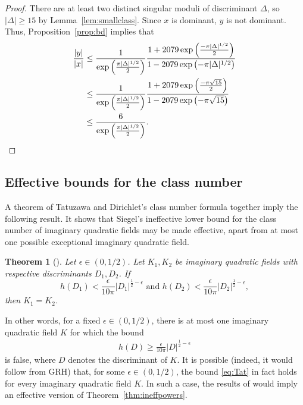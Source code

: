 \documentclass[11pt,a4paper, british]{amsart}
\newtheorem{thm}{Theorem}[section]
\theoremstyle{definition}
\theoremstyle{remark}
\numberwithin{equation}{section}
\begin{document}
\begin{proof}
	There are at least two distinct singular moduli of discriminant $\Delta$, so $\lvert \Delta \rvert \geq 15$ by Lemma~\ref{lem:smallclass}. Since $x$ is dominant, $y$ is not dominant.  Thus, Proposition~\ref{prop:bd} implies that
	\begin{align*}
		\frac{\lvert y \rvert}{\lvert x \rvert} &\leq  \frac{1}{\exp\left(\frac{\pi \lvert \Delta \rvert^{1/2}}{2}\right)} \frac{1 + 2079 \exp\left(\frac{-\pi \lvert \Delta \rvert^{1/2}}{2}\right)}{1 - 2079 \exp\left(- \pi \lvert \Delta \rvert^{1/2}\right)}\\ 
		&\leq \frac{1}{\exp\left(\frac{\pi \lvert \Delta \rvert^{1/2}}{2}\right)} \frac{1 + 2079 \exp\left(\frac{-\pi \sqrt{15}}{2}\right)}{1 - 2079 \exp\left(- \pi \sqrt{15}\right)}\\ 
		&\leq \frac{6}{\exp\left(\frac{\pi \lvert \Delta \rvert^{1/2}}{2}\right)}.\qedhere
		\end{align*}
\end{proof}



\subsection{Effective bounds for the class number}\label{subsec:Tatuzawa}



 A theorem of Tatuzawa \cite[Theorem 1]{Tatuzawa51} and Dirichlet's class number formula together imply the following result. It shows that Siegel's \cite{Siegel35} ineffective lower bound for the class number of imaginary quadratic fields may be made effective, apart from at most one possible exceptional imaginary quadratic field.


\begin{thm}[{\cite[Theorem 1]{Tatuzawa51}}]\label{thm:tatfund}
	Let $\epsilon \in (0, 1/2)$. Let $K_1, K_2$ be imaginary quadratic fields with respective discriminants $D_1, D_2$. If 
	\[ h(D_1) < \frac{\epsilon}{10 \pi} \lvert D_1 \rvert^{\frac{1}{2} - \epsilon} \mbox{ and } h(D_2) < \frac{\epsilon}{10 \pi} \lvert D_2 \rvert^{\frac{1}{2} - \epsilon},\]
	then $K_1 = K_2$.
\end{thm}

In other words, for a fixed $\epsilon \in (0, 1/2)$, there is at most one imaginary quadratic field $K$ for which the bound
\begin{align}\label{eq:Tat}
	 h(D) \geq \frac{\epsilon}{10 \pi} \lvert D \rvert^{\frac{1}{2} - \epsilon}
	 \end{align}
is false, where $D$ denotes the discriminant of $K$.
It is possible (indeed, it would follow from GRH) that, for some $\epsilon \in (0, 1/2)$, the bound \eqref{eq:Tat} in fact holds for every imaginary quadratic field $K$. In such a case, the results of \cite{Binyamini19} would imply an effective version of Theorem~\ref{thm:ineffpowers}.
\end{document}
